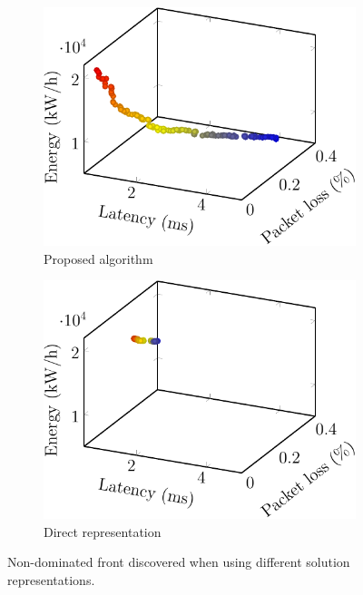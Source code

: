 \begin{figure}[t!]
    \centering
    \begin{subfigure}[b]{0.49\linewidth}
        \includegraphics[width=\textwidth]{graphs/comparison/qm-crop}
        \caption{Proposed algorithm}
    \end{subfigure}
    \begin{subfigure}[b]{0.49\linewidth}
        \includegraphics[width=\textwidth]{graphs/comparison/std-crop}
        \caption{Direct representation}
    \end{subfigure}

    \vspace{1em}
    \caption{Non-dominated front discovered when using different solution representations.}
    \label{fig:solution_representation_objectives}
\end{figure}

